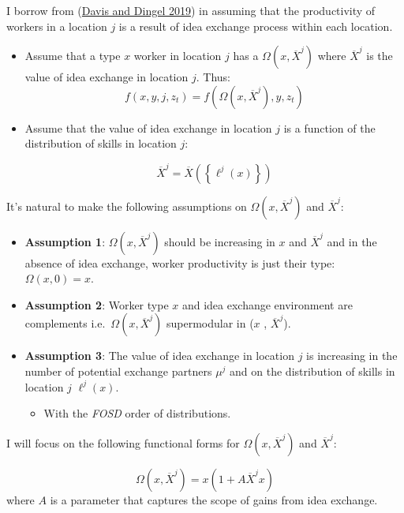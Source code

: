 \documentclass[
  letterpaper,
  DIV=11,
  numbers=noendperiod]{scrreprt}
\providecommand{\tightlist}{%
  \setlength{\itemsep}{0pt}\setlength{\parskip}{0pt}}\usepackage{longtable,booktabs,array}
\begin{document}
I borrow from
(\protect\hyperlink{ref-davisSpatialKnowledgeEconomy2019}{Davis and
Dingel 2019}) in assuming that the productivity of workers in a location
\(j\) is a result of idea exchange process within each location.

\begin{itemize}
\item
  Assume that a type \(x\) worker in location \(j\) has a
  \(\Omega(x, \overline{X}^j)\) where \(\overline{X}^j\) is the value of
  idea exchange in location \(j\). Thus:
  \[f(x,y,j,z_t) = f\left(\Omega(x, \overline{X}^j), y, z_t\right)\]
\item
  Assume that the value of idea exchange in location \(j\) is a function
  of the distribution of skills in location \(j\):

  \[ \overline{X}^j = \overline{X}\left(\left\{\ell^j(x)\right\}\right) \]
\end{itemize}

It's natural to make the following assumptions on
\(\Omega(x, \overline{X}^j)\) and \(\overline{X}^j\):

\begin{itemize}
\tightlist
\item
  \textbf{Assumption 1}: \(\Omega(x, \overline{X}^j)\) should be
  increasing in \(x\) and \(\overline{X}^j\) and in the absence of idea
  exchange, worker productivity is just their type:
  \(\Omega(x, 0) = x\).
\item
  \textbf{Assumption 2}: Worker type \(x\) and idea exchange environment
  are complements i.e.~\(\Omega(x, \overline{X}^j)\) supermodular in
  (\(x\) , \(\overline{X}^j\)).
\item
  \textbf{Assumption 3}: The value of idea exchange in location \(j\) is
  increasing in the number of potential exchange partners \(\mu^j\) and
  on the distribution of skills in location \(j\) \(\ell^j(x)\).

  \begin{itemize}
  \tightlist
  \item
    With the \emph{FOSD} order of distributions.
  \end{itemize}
\end{itemize}

I will focus on the following functional forms for
\(\Omega(x, \overline{X}^j)\) and \(\overline{X}^j\):

\[\Omega(x, \overline{X}^j) = x(1 + A \overline{X}^j x)\] where \(A\) is
a parameter that captures the scope of gains from idea exchange.
\end{document}
